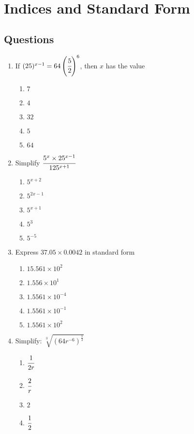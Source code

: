 \section{Indices and Standard Form}
\subsection{Questions}
\begin{multicols}{2}
\begin{enumerate}[label={\arabic*.}] 
\item If $(25)^{x-1} = 64\left(\cfrac{5}{2}\right)^6$, then $x$ has the value
	\begin{enumerate}[label={\Alph*.}]
	\item \(7\)
	\item \(4\)
	\item \(32\)
	\item \(5\)
	\item \(64\)
	\end{enumerate}
\item Simplify $\cfrac{5^x \times 25^{x -1}}{125^{x+1}}$
	\begin{enumerate}[label={\Alph*.}]
	\item \(5^{x+2}\)
	\item \(5^{2x -1}\)
	\item \(5^{x+1}\)
	\item \(5^3\)
	\item \(5^{-5}\)
	\end{enumerate}
\item Express $37.05 \times 0.0042$ in standard form 
	\begin{enumerate}[label={\Alph*.}]
	\item \(15.561 \times 10^2\)
	\item \(1.556 \times 10^1\)
	\item \(1.5561 \times 10^{-4}\)
	\item \(1.5561 \times 10^{-1}\)
	\item \(1.5561 \times 10^2\)
	\end{enumerate}
\item Simplify: $\sqrt[3]{(64r^{-6})^\frac{1}{2}}$
	\begin{enumerate}[label={\Alph*.}]
	\item \(\cfrac{1}{2r}\)
	\item \(\cfrac{2}{r}\)
	\item \(2\)
	\item \(\cfrac{1}{2}\)
	\end{enumerate}

\end{enumerate}
\end{multicols}
